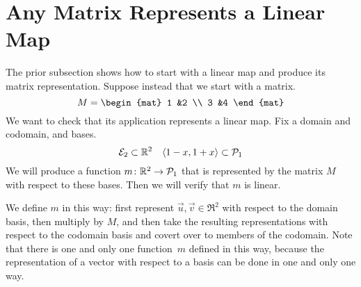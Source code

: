 \documentclass[10pt,t,serif,professionalfont]{beamer}
\begin{document}
\section{Any Matrix Represents a Linear Map}
\begin{frame}
\ex
The prior subsection shows how to start with a linear map and produce its matrix
representation.
Suppose instead that we start with a matrix.
\begin{equation*}
  M=\begin{mat}
    1 &2 \\
    3 &4
  \end{mat}
\end{equation*}
We want to check that its application represents a linear map.
\pause
Fix a domain and codomain, and bases.
\begin{equation*}
  {\cal E}_2\subset\mathbb{R}^2
  \quad
  \langle1-x,1+x\rangle\subset\mathcal{P}_1
\end{equation*}
We will produce a function $\mbox{$m\colon \mathbb{R}^2\to \mathcal{P}_1$}$
that is represented by the matrix $M$ with respect to these bases.
Then we will verify that $m$ is linear.

\pause
We define $m$ in this way: 
first represent $\vec{u}, \vec{v}\in\Re^2$ with respect to the domain basis,
then multiply by $M$, and then take the resulting representations
with respect to the codomain basis and covert over to members of the codomain.
\pause
Note that there is one and only one function~$m$ defined in this way, because
the representation of a vector with respect to a basis can be done in
one and only one way.
\end{frame}
\end{document}

